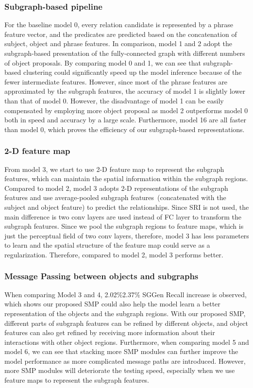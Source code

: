 \documentclass[runningheads]{llncs}
\begin{document}
\subsubsection{Subgraph-based pipeline}
For the baseline model 0, every relation candidate is represented by a phrase feature vector, and the predicates are predicted based on the concatenation of subject, object and phrase features. In comparison, model 1 and 2 adopt the subgraph-based presentation of the fully-connected graph with different numbers of object proposals. 
By comparing model 0 and 1, we can see that subgraph-based clustering could significantly speed up the model inference because of the fewer intermediate features. However, since most of the phrase features are approximated by the subgraph features, the accuracy of model 1 is slightly lower than that of model 0.
However, the disadvantage of model 1 can be easily compensated by employing more object proposal as model 2 outperforms model 0 both in speed and accuracy by a large scale. Furthermore, model 16 are all faster than model 0, which proves the efficiency of our subgraph-based representations. 


\subsubsection{2-D feature map}
From model 3, we start to use 2-D feature map to represent the subgraph features, which can maintain the spatial information within the subgraph regions. Compared to model 2, model 3 adopts 2-D representations of the subgraph features and use average-pooled subgraph features~(concatenated with the subject and object feature) to predict the relationships. Since SRI is not used, the main difference is two  conv layers are used instead of FC layer to transform the subgraph features. Since we pool the subgraph regions to  feature maps, which is just the perceptual field of two  conv layers, therefore, model 3 has less parameters to learn and the spatial structure of the feature map could serve as a regularization. Therefore, compared to model 2, model 3 performs better. 

\subsubsection{Message Passing between objects and subgraphs} When comparing Model 3 and 4, 2.02\%2.37\% SGGen Recall increase is observed, which shows our proposed SMP could also help the model learn a better representation of the objects and the subgraph regions. With our proposed SMP, different parts of subgraph features can be refined by different objects, and object features can also get refined by receiving more information about their interactions with other object regions. 
Furthermore, when comparing model 5 and model 6, we can see that stacking more SMP modules can further improve the model performance as more complicated message paths are introduced. However, more SMP modules will deteriorate the testing speed, especially when we use feature maps to represent the subgraph features. 
\end{document}
